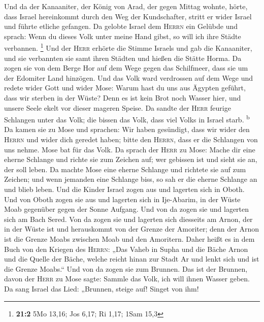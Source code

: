  Und da der Kanaaniter, der König von Arad, der gegen
Mittag wohnte, hörte, dass Israel hereinkommt durch den Weg der
Kundschafter, stritt er wider Israel und führte etliche gefangen.
 Da gelobte Israel dem \textsc{Herrn} ein Gelübde und
sprach: Wenn du dieses Volk unter meine Hand gibst, so will ich ihre
Städte verbannen. \footnote{\textbf{21:2} 5Mo 13,16; Jos 6,17; Ri 1,17;
  1Sam 15,3}  Und der \textsc{Herr} erhörte die Stimme
Israels und gab die Kanaaniter, und sie verbannten sie samt ihren
Städten und hießen die Stätte Horma.  Da zogen sie von dem
Berge Hor auf dem Wege gegen das Schilfmeer, dass sie um der Edomiter
Land hinzögen. Und das Volk ward verdrossen auf dem Wege 
und redete wider Gott und wider Mose: Warum hast du uns aus Ägypten
geführt, dass wir sterben in der Wüste? Denn es ist kein Brot noch
Wasser hier, und unsere Seele ekelt vor dieser mageren Speise.
 Da sandte der \textsc{Herr} feurige Schlangen unter das
Volk; die bissen das Volk, dass viel Volks in Israel starb.
\textsuperscript{b}  Da kamen sie zu Mose und sprachen:
Wir haben gesündigt, dass wir wider den \textsc{Herrn} und wider dich
geredet haben; bitte den \textsc{Herrn}, dass er die Schlangen von uns
nehme. Mose bat für das Volk.  Da sprach der \textsc{Herr}
zu Mose: Mache dir eine eherne Schlange und richte sie zum Zeichen auf;
wer gebissen ist und sieht sie an, der soll leben.  Da
machte Mose eine eherne Schlange und richtete sie auf zum Zeichen; und
wenn jemanden eine Schlange biss, so sah er die eherne Schlange an und
blieb leben.  Und die Kinder Israel zogen aus und
lagerten sich in Oboth.  Und von Oboth zogen sie aus und
lagerten sich in Ije-Abarim, in der Wüste Moab gegenüber gegen der Sonne
Aufgang.  Und von da zogen sie und lagerten sich am Bach
Sered.  Von da zogen sie und lagerten sich diesseits am
Arnon, der in der Wüste ist und herauskommt von der Grenze der Amoriter;
denn der Arnon ist die Grenze Moabs zwischen Moab und den Amoritern.
 Daher heißt es in dem Buch von den Kriegen des
\textsc{Herrn}: „Das Vaheb in Supha und die Bäche Arnon 
und die Quelle der Bäche, welche reicht hinan zur Stadt Ar und lenkt
sich und ist die Grenze Moabs.``  Und von da zogen sie
zum Brunnen. Das ist der Brunnen, davon der \textsc{Herr} zu Mose sagte:
Sammle das Volk, ich will ihnen Wasser geben.  Da sang
Israel das Lied: „Brunnen, steige auf! Singet von ihm! 

